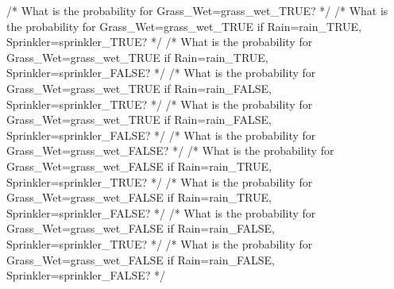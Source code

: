 \documentclass[
  11pt,
  letterpaper,
  openany]{book}
\newenvironment{Shaded}{\begin{snugshade}}{\end{snugshade}}
\newcommand{\ErrorTok}[1]{\textcolor[rgb]{0.68,0.00,0.00}{#1}}
\begin{document}
\begin{landscape}
\begin{Shaded}
\begin{Highlighting}[]
    \ErrorTok{/*} \ErrorTok{What} \ErrorTok{is} \ErrorTok{the} \ErrorTok{probability} \ErrorTok{for} \ErrorTok{Grass\_Wet=grass\_wet\_TRUE?} \ErrorTok{*/}
    \ErrorTok{/*} \ErrorTok{What} \ErrorTok{is} \ErrorTok{the} \ErrorTok{probability} \ErrorTok{for} \ErrorTok{Grass\_Wet=grass\_wet\_TRUE} \ErrorTok{if} \ErrorTok{Rain=rain\_TRUE,} \ErrorTok{Sprinkler=sprinkler\_TRUE?} \ErrorTok{*/}
    \ErrorTok{/*} \ErrorTok{What} \ErrorTok{is} \ErrorTok{the} \ErrorTok{probability} \ErrorTok{for} \ErrorTok{Grass\_Wet=grass\_wet\_TRUE} \ErrorTok{if} \ErrorTok{Rain=rain\_TRUE,} \ErrorTok{Sprinkler=sprinkler\_FALSE?} \ErrorTok{*/}
    \ErrorTok{/*} \ErrorTok{What} \ErrorTok{is} \ErrorTok{the} \ErrorTok{probability} \ErrorTok{for} \ErrorTok{Grass\_Wet=grass\_wet\_TRUE} \ErrorTok{if} \ErrorTok{Rain=rain\_FALSE,} \ErrorTok{Sprinkler=sprinkler\_TRUE?} \ErrorTok{*/}
    \ErrorTok{/*} \ErrorTok{What} \ErrorTok{is} \ErrorTok{the} \ErrorTok{probability} \ErrorTok{for} \ErrorTok{Grass\_Wet=grass\_wet\_TRUE} \ErrorTok{if} \ErrorTok{Rain=rain\_FALSE,} \ErrorTok{Sprinkler=sprinkler\_FALSE?} \ErrorTok{*/}
    \ErrorTok{/*} \ErrorTok{What} \ErrorTok{is} \ErrorTok{the} \ErrorTok{probability} \ErrorTok{for} \ErrorTok{Grass\_Wet=grass\_wet\_FALSE?} \ErrorTok{*/}
    \ErrorTok{/*} \ErrorTok{What} \ErrorTok{is} \ErrorTok{the} \ErrorTok{probability} \ErrorTok{for} \ErrorTok{Grass\_Wet=grass\_wet\_FALSE} \ErrorTok{if} \ErrorTok{Rain=rain\_TRUE,} \ErrorTok{Sprinkler=sprinkler\_TRUE?} \ErrorTok{*/}
    \ErrorTok{/*} \ErrorTok{What} \ErrorTok{is} \ErrorTok{the} \ErrorTok{probability} \ErrorTok{for} \ErrorTok{Grass\_Wet=grass\_wet\_FALSE} \ErrorTok{if} \ErrorTok{Rain=rain\_TRUE,} \ErrorTok{Sprinkler=sprinkler\_FALSE?} \ErrorTok{*/}
    \ErrorTok{/*} \ErrorTok{What} \ErrorTok{is} \ErrorTok{the} \ErrorTok{probability} \ErrorTok{for} \ErrorTok{Grass\_Wet=grass\_wet\_FALSE} \ErrorTok{if} \ErrorTok{Rain=rain\_FALSE,} \ErrorTok{Sprinkler=sprinkler\_TRUE?} \ErrorTok{*/}
    \ErrorTok{/*} \ErrorTok{What} \ErrorTok{is} \ErrorTok{the} \ErrorTok{probability} \ErrorTok{for} \ErrorTok{Grass\_Wet=grass\_wet\_FALSE} \ErrorTok{if} \ErrorTok{Rain=rain\_FALSE,} \ErrorTok{Sprinkler=sprinkler\_FALSE?} \ErrorTok{*/}

\end{Highlighting}
\end{Shaded}
\end{landscape}
\end{document}
